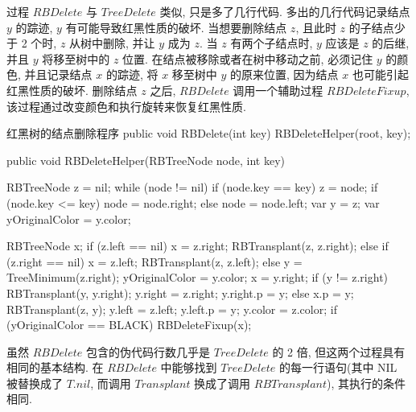 \documentclass[oneside,10pt,fontset=none]{ctexbook}
\numberwithin{definition}{chapter}
\numberwithin{theorem}{chapter}
\numberwithin{lemma}{chapter}
\begin{document}
过程 $RBDelete$ 与 $TreeDelete$ 类似, 只是多了几行代码. 多出的几行代码记录结点 $y$ 的踪迹, $y$ 有可能导致红黑性质的破坏. 当想要删除结点 $z$, 且此时 $z$ 的子结点少于 2 个时, $z$ 从树中删除, 并让 $y$ 成为 $z$. 当 $z$ 有两个子结点时, $y$ 应该是 $z$ 的后继, 并且 $y$ 将移至树中的 $z$ 位置. 在结点被移除或者在树中移动之前, 必须记住 $y$ 的颜色, 并且记录结点 $x$ 的踪迹, 将 $x$ 移至树中 $y$ 的原来位置, 因为结点 $x$ 也可能引起红黑性质的破坏. 删除结点 $z$ 之后, $RBDelete$ 调用一个辅助过程 $RBDeleteFixup$, 该过程通过改变颜色和执行旋转来恢复红黑性质.

\begin{myjava}{}{红黑树的结点删除程序}{}
public void RBDelete(int key) {
    RBDeleteHelper(root, key);
}

public void RBDeleteHelper(RBTreeNode node, int key) {
    RBTreeNode z = nil;
    while (node != nil) {
        if (node.key == key) z = node;
        if (node.key <= key) node = node.right;
        else node = node.left;
    }
    var y = z;
    var yOriginalColor = y.color;

    RBTreeNode x;
    if (z.left == nil) {
        x = z.right;
        RBTransplant(z, z.right);
    } else if (z.right == nil) {
        x = z.left;
        RBTransplant(z, z.left);
    } else {
        y = TreeMinimum(z.right);
        yOriginalColor = y.color;
        x = y.right;
        if (y != z.right) {
            RBTransplant(y, y.right);
            y.right = z.right;
            y.right.p = y;
        } else {
            x.p = y;
        }
        RBTransplant(z, y);
        y.left = z.left;
        y.left.p = y;
        y.color = z.color;
    }
    if (yOriginalColor == BLACK)
        RBDeleteFixup(x);
}
\end{myjava}

虽然 $RBDelete$ 包含的伪代码行数几乎是 $TreeDelete$ 的 2 倍, 但这两个过程具有相同的基本结构. 在 $RBDelete$ 中能够找到 $TreeDelete$ 的每一行语句(其中 NIL 被替换成了 $T.nil$, 而调用 $Transplant$ 换成了调用 $RBTransplant$), 其执行的条件相同.
\end{document}
